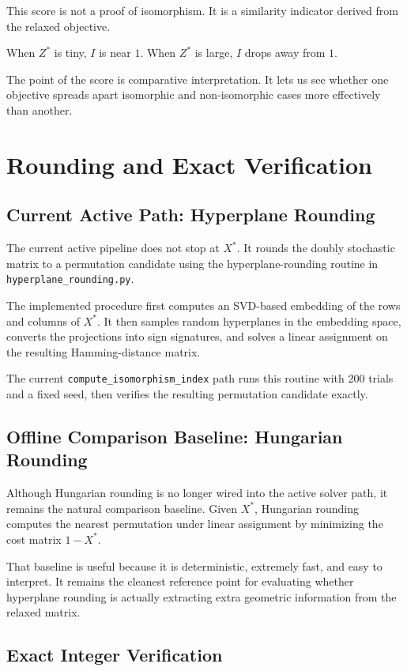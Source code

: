 \documentclass[11pt]{article}
\begin{document}
This score is not a proof of isomorphism.
It is a similarity indicator derived from the relaxed objective.

When $Z^*$ is tiny, $I$ is near $1$.
When $Z^*$ is large, $I$ drops away from $1$.

The point of the score is comparative interpretation.
It lets us see whether one objective spreads apart isomorphic and non-isomorphic cases more effectively than another.

\section{Rounding and Exact Verification}

\subsection{Current Active Path: Hyperplane Rounding}

The current active pipeline does not stop at $X^*$.
It rounds the doubly stochastic matrix to a permutation candidate using the hyperplane-rounding routine in \texttt{hyperplane\_rounding.py}.

The implemented procedure first computes an SVD-based embedding of the rows and columns of $X^*$.
It then samples random hyperplanes in the embedding space, converts the projections into sign signatures, and solves a linear assignment on the resulting Hamming-distance matrix.

The current \texttt{compute\_isomorphism\_index} path runs this routine with 200 trials and a fixed seed, then verifies the resulting permutation candidate exactly.

\subsection{Offline Comparison Baseline: Hungarian Rounding}

Although Hungarian rounding is no longer wired into the active solver path, it remains the natural comparison baseline.
Given $X^*$, Hungarian rounding computes the nearest permutation under linear assignment by minimizing the cost matrix $1 - X^*$.

That baseline is useful because it is deterministic, extremely fast, and easy to interpret.
It remains the cleanest reference point for evaluating whether hyperplane rounding is actually extracting extra geometric information from the relaxed matrix.

\subsection{Exact Integer Verification}
\end{document}
